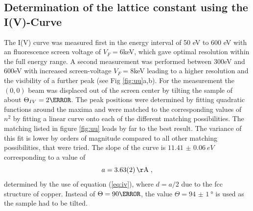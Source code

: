 \documentclass[a4paper]{scrartcl}
\numberwithin{equation}{section}
\numberwithin{figure}{section}
\numberwithin{table}{section}
\newcommand{\eq}[2]{\begin{equation}#1\label{#2}\end{equation}}
\newcommand{\Formel}[1]{(\ref{#1})}
\begin{document}
\subsection{Determination of the lattice constant using the I(V)-Curve}
The I(V) curve was measured first in the energy interval of 50 eV to 600 eV with an fluorescence screen voltage of $V_F=6$keV, which gave optimal resolution within the full energy range. A second measurement was performed between 300eV and 600eV with increased screen-voltage $V_F=8$keV leading to a higher resolution and the visibility of a further peak (see Fig \ref{fig:uu}a,b). For the measurement the $(0,0)$ beam was displaced out of the screen center by tilting the sample of about $\Theta_{IV}=2 \degree$. The peak positions were determined by fitting quadratic functions around the maxima and were matched to the corresponding values of $n^2$ by fitting a linear curve onto each of the different matching possibilities. The matching listed in figure \ref{fig:uu} leads by far to the best result. The variance of this fit is lower by orders of magnitude compared to all other matching possibilities, that were tried. The slope of the curve is $\SI{11.41(6)}{eV}$ corresponding to a value of 
\eq{a = \SI{3.63(2)}{\AA}  \;,}{ivresult}
determined by the use of equation \Formel{eq:iv}, where $d=a/2$ due to the fcc structure of copper. Instead of $\Theta=90 \degree$, the value $\Theta=\SI{94(1)}{\degree}$ is used as the sample had to be tilted.
\end{document}
